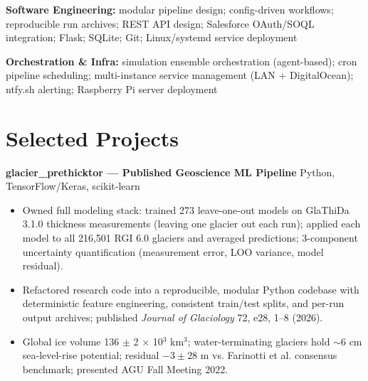\documentclass[11pt,a4paper]{article}
\begin{document}
\noindent
\textbf{Software Engineering:} modular pipeline design; config-driven workflows; reproducible run archives; REST API design; Salesforce OAuth/SOQL integration; Flask; SQLite; Git; Linux/systemd service deployment

\noindent
\textbf{Orchestration \& Infra:} simulation ensemble orchestration (agent-based); cron pipeline scheduling; multi-instance service management (LAN + DigitalOcean); ntfy.sh alerting; Raspberry Pi server deployment

\section*{Selected Projects}

\noindent
\textbf{glacier\_prethicktor --- Published Geoscience ML Pipeline} \hfill Python, TensorFlow/Keras, scikit-learn
\begin{itemize}
    \item Owned full modeling stack: trained 273 leave-one-out models on GlaThiDa 3.1.0 thickness measurements (leaving one glacier out each run); applied each model to all 216,501 RGI 6.0 glaciers and averaged predictions; 3-component uncertainty quantification (measurement error, LOO variance, model residual).
    \item Refactored research code into a reproducible, modular Python codebase with deterministic feature engineering, consistent train/test splits, and per-run output archives; published \textit{Journal of Glaciology} 72, e28, 1--8 (2026).
    \item Global ice volume 136 $\pm$ 2 $\times$ 10$^3$ km$^3$; water-terminating glaciers hold $\sim$6 cm sea-level-rise potential; residual $-3 \pm 28$ m vs. Farinotti et al. consensus benchmark; presented AGU Fall Meeting 2022.
\end{itemize}
\end{document}
